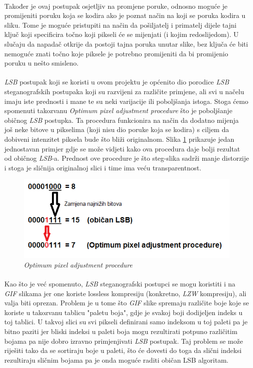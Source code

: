 \documentclass[times, utf8, seminar]{fer}
\begin{document}
\paragraph{}
Također je ovaj postupak osjetljiv na promjene poruke, odnosno moguće je promijeniti poruku koja se kodira ako je poznat način na koji se poruka kodira u sliku. Tome je moguće pristupiti na način da pošiljatelj i primatelj dijele tajni ključ koji specificira točno koji pikseli će se mijenjati (i kojim redoslijedom). U slučaju da napadač otkrije da postoji tajna poruka unutar slike, bez ključa će biti nemoguće znati točno koje piksele je potrebno promijeniti da bi promijenio poruku u nešto smisleno.
\paragraph{}
\textit{LSB} postupak koji se koristi u ovom projektu je općenito dio porodice \textit{LSB} steganografskih postupaka koji su razvijeni za različite primjene, ali svi u načelu imaju iste prednosti i mane te su neki varijacije ili poboljšanja istoga. Stoga ćemo spomenuti takozvanu \textit{Optimum pixel adjustment procedure} što je poboljšanje običnog \textit{LSB} postupka. Ta procedura funkcionira na način da dodatno mijenja još neke bitove u pikselima (koji nisu dio poruke koja se kodira) s ciljem da dobiveni intenzitet piksela bude što bliži originalnom. Slika \ref{lsb_cmp} prikazuje jedan jednostavan primjer gdje se može vidjeti kako ova procedura daje bolji rezultat od običnog \textit{LSB}-a. Prednost ove procedure je što steg-slika sadrži manje distorzije i stoga je sličnija originalnoj slici i time ima veću transparentnost.
\begin{figure}
\caption{\textit{Optimum pixel adjustment procedure}}
\label{lsb_cmp}
\centerline{\includegraphics[scale=0.8]{images/LSB_cmp.png}}
\end{figure}
\paragraph{}
Kao što je već spomenuto, \textit{LSB} steganografski postupci se mogu koristiti i na \textit{GIF} slikama jer one koriste lossless kompresiju (konkretno, \textit{LZW} kompresiju), ali valja biti oprezan. Problem je u tome što \textit{GIF} slike spremaju različite boje koje se koriste u takozvanu tablicu "paletu boja", gdje je svakoj boji dodijeljen indeks u toj tablici. U takvoj slici su svi pikseli definirani samo indeksom u toj paleti pa je bitno paziti jer bliski indeksi u paleti boja mogu rezultirati potpuno različitim bojama pa nije dobro izravno primjenjivati \textit{LSB} postupak. Taj problem se može riješiti tako da se sortiraju boje u paleti, što će dovesti do toga da slični indeksi rezultiraju sličnim bojama pa je onda moguće raditi običan LSB algoritam.
\end{document}
